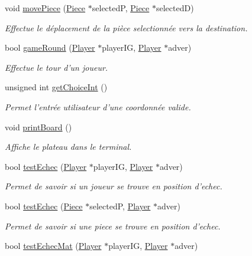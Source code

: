 \begin{DoxyCompactItemize}
void \hyperlink{class_chess_aec36eadf1a550d2f6c85ec8a23bac2d1}{move\-Piece} (\hyperlink{class_piece}{Piece} $\ast$selected\-P, \hyperlink{class_piece}{Piece} $\ast$selected\-D)
\begin{DoxyCompactList}\small\item\em Effectue le déplacement de la pièce selectionnée vers la destination. \end{DoxyCompactList}\item 
bool \hyperlink{class_chess_ac521e181e266322da1664977b102afc5}{game\-Round} (\hyperlink{class_player}{Player} $\ast$player\-I\-G, \hyperlink{class_player}{Player} $\ast$adver)
\begin{DoxyCompactList}\small\item\em Effectue le tour d'un joueur. \end{DoxyCompactList}\item 
unsigned int \hyperlink{class_chess_a7d4dbb556159e245fe753d5a6daada8b}{get\-Choice\-Int} ()
\begin{DoxyCompactList}\small\item\em Permet l'entrée utilisateur d'une coordonnée valide. \end{DoxyCompactList}\item 
void \hyperlink{class_chess_a9cd677e16f4c08ddcdad57a4e12be99f}{print\-Board} ()
\begin{DoxyCompactList}\small\item\em Affiche le plateau dans le terminal. \end{DoxyCompactList}\item 
bool \hyperlink{class_chess_aae6464a0576a72f63aab8450b18dd580}{test\-Echec} (\hyperlink{class_player}{Player} $\ast$player\-I\-G, \hyperlink{class_player}{Player} $\ast$adver)
\begin{DoxyCompactList}\small\item\em Permet de savoir si un joueur se trouve en position d'echec. \end{DoxyCompactList}\item 
bool \hyperlink{class_chess_a1b5cf39c4f616e5e79bd16d4837bc2dc}{test\-Echec} (\hyperlink{class_piece}{Piece} $\ast$selected\-P, \hyperlink{class_player}{Player} $\ast$adver)
\begin{DoxyCompactList}\small\item\em Permet de savoir si une piece se trouve en position d'echec. \end{DoxyCompactList}\item 
bool \hyperlink{class_chess_a591da78c202b3e870c683789662a65c4}{test\-Echec\-Mat} (\hyperlink{class_player}{Player} $\ast$player\-I\-G, \hyperlink{class_player}{Player} $\ast$adver)

\end{DoxyCompactItemize}
